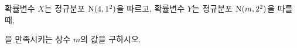 확률변수 $X$는 정규분포 $\mathrm{N}(4{,}\mkern3mu\mathopen{}1^2)$을 따르고, 확률변수 $Y$는 정규분포 $\mathrm{N}(m{,}\mkern3mu\mathopen{}2^2)$을 따를 때, \par\smallskip{}\par\smallskip\noindent 을 만족시키는 상수 $m$의 값을 구하시오.
